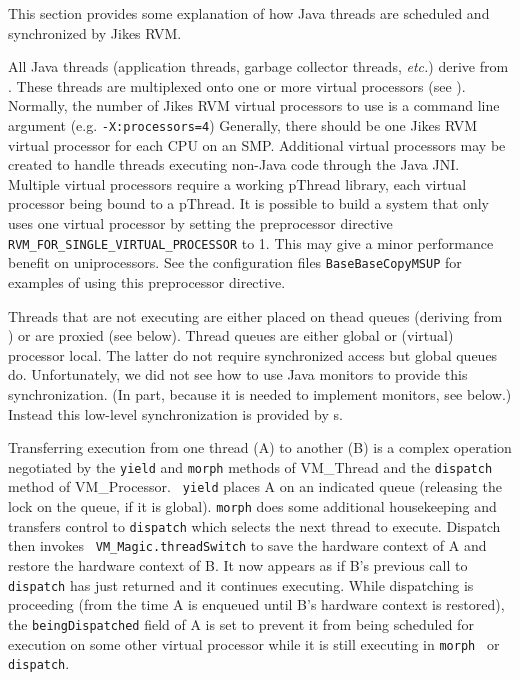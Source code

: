 This section provides some explanation of how Java\TMweb{} threads are
scheduled and synchronized by Jikes\TMweb{} RVM.


All Java threads (application threads, garbage collector threads, {\em
etc.})  derive from 
.  
These threads are multiplexed onto
one or more virtual processors (see 
).  Normally, the
number of Jikes RVM virtual processors to use is a command line argument
(e.g. {\tt -X:processors=4}) Generally, there should be one Jikes RVM
virtual processor for each CPU on an SMP.  Additional virtual
processors may be created to handle threads executing non-Java code
through the Java JNI.  Multiple virtual processors require a working
pThread library, each virtual processor being bound to a pThread.  It
is possible to build a system that only uses one virtual processor by
setting the preprocessor directive {\tt
RVM\_\-FOR\_\-SIN\-GLE\_\-VIR\-TU\-AL\_\-PRO\-CES\-SOR} to 1.  This may give a minor
performance benefit on uniprocessors. See the configuration files
{\tt BaseBaseCopyMSUP} for examples of
using this preprocessor directive.

Threads that are not executing are either placed on thead queues
(deriving from 
) or are proxied (see below).
Thread queues are either global or (virtual) processor local.  The
latter do not require synchronized access but global queues do.
Unfortunately, we did not see how to use Java monitors to provide
this synchronization.  (In part, because it is needed to implement
monitors, see below.)  Instead this low-level synchronization is
provided by 
s.

Transferring execution from one thread (A) to another (B) is a complex
operation negotiated by the {\tt yield} and {\tt morph} methods of
VM\_Thread and the {\tt dispatch} method of VM\_Processor.  {\tt
yield} places A on an indicated queue (releasing the lock on the
queue, if it is global).  {\tt morph} does some additional
housekeeping and transfers control to {\tt dispatch} which selects the
next thread to execute. Dispatch then invokes {\tt
VM\_Ma\-gic.thread\-Switch} to save the hardware context of A and restore
the hardware context of B.  It now appears as if B's previous call to
{\tt dispatch} has just returned and it continues executing. While
dispatching is proceeding (from the time A is enqueued until B's
hardware context is restored), the {\tt be\-ing\-Dis\-patched} field of A is
set to prevent it from being scheduled for execution on some other
virtual processor while it is still executing in {\tt morph } or {\tt
dispatch}. 

